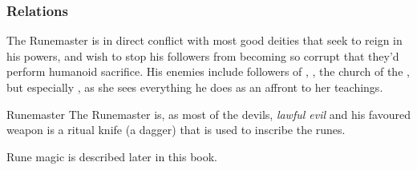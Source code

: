\subsubsection{Relations}

The Runemaster is in direct conflict with most good deities that seek
to reign in his powers, and wish to stop his followers from becoming so corrupt
that they'd perform humanoid sacrifice. His enemies include followers of
, , the church of the ,
but especially , as she sees everything he does as an
affront to her teachings.

\begin{35e}{Runemaster}
  The Runemaster is, as most of the devils, \emph{lawful evil} and his
  favoured weapon is a ritual knife (a dagger) that is used to inscribe the
  runes.

  Rune magic is described later in this book.
\end{35e}
